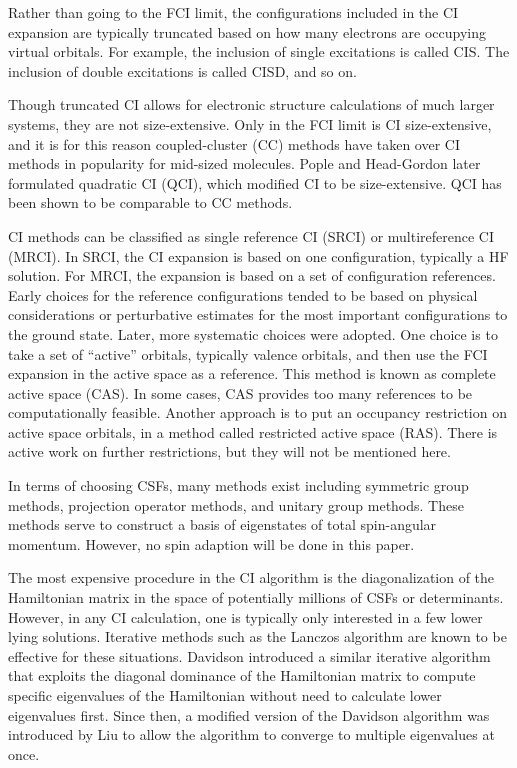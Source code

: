 \documentclass[final,3p,times,twocolumn]{elsarticle}
\begin{document}
Rather than going to the FCI limit, the configurations included in the CI expansion are typically truncated based on how many electrons are occupying virtual orbitals. For example, the inclusion of single excitations is called CIS. The inclusion of double excitations is called CISD, and so on.\cite{szabo}  

Though truncated CI allows for electronic structure calculations of much larger systems, they are not size-extensive. Only in the FCI limit is CI size-extensive, and it is for this reason coupled-cluster (CC) methods have taken over CI methods in popularity for mid-sized molecules.\cite{cc,bartlett-2007} Pople and Head-Gordon later formulated quadratic CI (QCI), which modified CI to be size-extensive.\cite{qci} QCI has been shown to be comparable to CC methods.\cite{werner-1992}

CI methods can be classified as single reference CI (SRCI) or multireference CI (MRCI). In SRCI, the CI expansion is based on one configuration, typically a HF solution. For MRCI, the expansion is based on a set of configuration references.\cite{hackmeyer-1969} Early choices for the reference configurations tended to be based on physical considerations\cite{shavitt-1974} or perturbative estimates for the most important configurations to the ground state.\cite{nesbet-1955} Later, more systematic choices were adopted. One choice is to take a set of ``active'' orbitals, typically valence orbitals, and then use the FCI expansion in the active space as a reference.\cite{cas} This method is known as complete active space (CAS). In some cases, CAS provides too many references to be computationally feasible. Another approach is to put an occupancy restriction on active space orbitals, in a method called restricted active space (RAS).\cite{ras} There is active work on further restrictions,\cite{shavitt} but they will not be mentioned here.

In terms of choosing CSFs, many methods exist including symmetric group methods,\cite{wigner} projection operator methods,\cite{lowdin} and unitary group methods.\cite{paldus-1974} These methods serve to construct a basis of eigenstates of total spin-angular momentum. However, no spin adaption will be done in this paper. %

The most expensive procedure in the CI algorithm is the diagonalization of the Hamiltonian matrix in the space of potentially millions of CSFs or determinants. However, in any CI calculation, one is typically only interested in a few lower lying solutions. Iterative methods such as the Lanczos algorithm are known to be effective for these situations.\cite{Lanczos} Davidson introduced a similar iterative algorithm that exploits the diagonal dominance of the Hamiltonian matrix to compute specific eigenvalues of the Hamiltonian without need to calculate lower eigenvalues first.\cite{davidson} Since then, a modified version of the Davidson algorithm was introduced by Liu to allow the algorithm to converge to multiple eigenvalues at once.\cite{liu}
\end{document}
